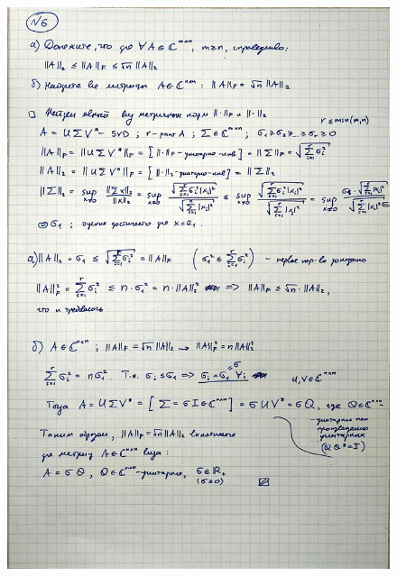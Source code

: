 \documentclass{article}
\begin{document}
	\begin{figure}[h!]
		\includegraphics[width=0.95\linewidth]{handwritten/matcomp_hw1_6}
	\end{figure}
	
\end{document}
